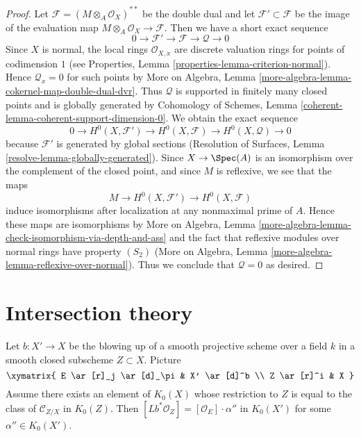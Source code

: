 \begin{proof}
Let $\mathcal{F} = (M \otimes_A \mathcal{O}_X)^{**}$ be the double dual and
let $\mathcal{F}' \subset \mathcal{F}$ be the image of the evaluation map
$M \otimes_A \mathcal{O}_X \to \mathcal{F}$. Then we have a short exact
sequence
$$
0 \to \mathcal{F}' \to \mathcal{F} \to \mathcal{Q} \to 0
$$
Since $X$ is normal, the local rings $\mathcal{O}_{X, x}$ are discrete
valuation rings for points of codimension $1$ (see
Properties, Lemma \ref{properties-lemma-criterion-normal}).
Hence $\mathcal{Q}_x = 0$ for such points by
More on Algebra, Lemma \ref{more-algebra-lemma-cokernel-map-double-dual-dvr}.
Thus $\mathcal{Q}$ is supported in finitely many closed points and is
globally generated by
Cohomology of Schemes, Lemma \ref{coherent-lemma-coherent-support-dimension-0}.
We obtain the exact sequence
$$
0 \to H^0(X, \mathcal{F}') \to H^0(X, \mathcal{F}) \to H^0(X, \mathcal{Q}) \to 0
$$
because $\mathcal{F}'$ is generated by global sections
(Resolution of Surfaces, Lemma \ref{resolve-lemma-globally-generated}).
Since $X \to \Spec(A)$ is an isomorphism over the complement of the
closed point, and since $M$ is reflexive, we see that the maps
$$
M \to H^0(X, \mathcal{F}') \to H^0(X, \mathcal{F})
$$
induce isomorphisms after localization at any nonmaximal prime of $A$.
Hence these maps are isomorphisms by More on Algebra, Lemma
\ref{more-algebra-lemma-check-isomorphism-via-depth-and-ass}
and the fact that reflexive modules over normal rings have property $(S_2)$
(More on Algebra, Lemma \ref{more-algebra-lemma-reflexive-over-normal}).
Thus we conclude that $\mathcal{Q} = 0$ as desired.
\end{proof}



\section{Intersection theory}
\label{section-intersection-theory}

\begin{lemma}
\label{lemma-good-blowing-up}
Let $b : X' \to X$ be the blowing up of a smooth projective
scheme over a field $k$ in a smooth closed subscheme $Z \subset X$.
Picture
$$
\xymatrix{
E \ar[r]_j \ar[d]_\pi & X' \ar[d]^b \\
Z \ar[r]^i & X
}
$$
Assume there exists an element of $K_0(X)$ whose restriction to
$Z$ is equal to the class of $\mathcal{C}_{Z/X}$ in $K_0(Z)$.
Then $[Lb^*\mathcal{O}_Z] = [\mathcal{O}_E] \cdot \alpha''$
in $K_0(X')$ for some $\alpha'' \in K_0(X')$.
\end{lemma}

